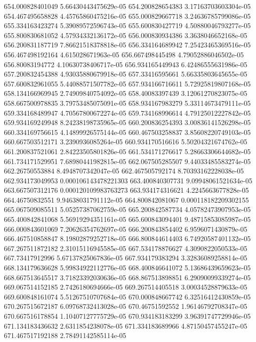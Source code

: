 {654.000828401049 5.66430443475629e-05
654.200828654383 3.17163703603304e-05
654.467495658828 4.45765860475216e-05
655.000829667718 3.24636785799086e-05
655.334163423274 5.39089572596743e-05
655.600830427719 4.50880046793277e-05
655.800830681052 4.57934332136172e-05
656.000830934386 3.3638046652168e-05
656.200831187719 7.86621518378818e-05
656.334164689942 7.25423465369516e-05
656.467498192164 4.615028671963e-05
656.667498445498 4.79052886046502e-05
656.80083194772 4.10630738406717e-05
656.934165449943 6.42486555631986e-05
657.200832454388 4.93035880679918e-05
657.33416595661 5.66335803645655e-05
657.600832961055 5.44088571507782e-05
657.934166716611 5.72925819807168e-05
658.134166969945 2.74909840754092e-05
658.40083397439 3.12061270823075e-05
658.667500978835 3.79753485075091e-05
658.934167983279 5.33114673479111e-05
659.334168489947 4.70567800672274e-05
659.734168996614 4.79125012227842e-05
659.934169249948 8.24238198735965e-05
660.200836254393 3.00836141526298e-05
660.334169756615 4.14899926575144e-05
660.467503258837 3.85608220749103e-05
660.667503512171 3.2390936085264e-05
660.934170516616 5.50204321674762e-05
661.200837521061 2.84223505801826e-05
661.534171276617 5.28663306644682e-05
661.734171529951 7.68980441982815e-05
662.067505285507 9.44033485583274e-05
662.26750553884 8.4948707342047e-05
662.467505792174 8.70393162228038e-05
662.934173049953 0.000106143478221303
663.400840307731 9.09948061521634e-05
663.667507312176 0.000120109983763273
663.934174316621 4.2245663677828e-05
664.46750832551 9.94638031791112e-05
664.800842081067 0.000118182209302155
665.067509085511 5.05257387062759e-05
665.200842587734 4.05782473907953e-05
665.400842841068 5.56919294351161e-05
665.600843094401 9.48715853085987e-05
666.000843601069 7.20626354762697e-05
666.200843854402 6.9596071430879e-05
666.467510858847 8.19802879252718e-05
666.800844614403 6.74920587401132e-05
667.267511872182 2.31015116945585e-05
667.534178876627 4.3090822050533e-05
667.73417912996 5.67137825067836e-05
667.934179383294 3.32836089258814e-05
668.134179636628 5.99834922112776e-05
668.400846641072 5.13686439659623e-05
668.667513645517 3.71823392030636e-05
668.867513898851 6.29090099339274e-05
669.067514152185 2.7426180694666e-05
669.267514405518 3.00034528879633e-05
669.600848161074 5.51267510707684e-05
670.000848667742 6.32516412430859e-05
670.267515672187 6.09768732413028e-05
670.46751592552 1.96146792708347e-05
670.667516178854 1.10407127775729e-05
670.934183183299 3.96391747729946e-05
671.134183436632 2.6311854238078e-05
671.334183689966 4.87150457455247e-05
671.467517192188 2.78491142585114e-05
}

